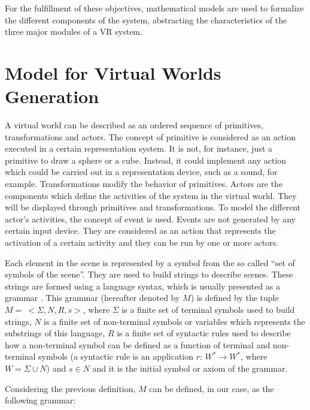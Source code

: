 \documentclass[10pt,journal,letterpaper,compsoc]{IEEEtran}
\begin{document}
For the fulfillment of these objectives, mathematical models are used to formalize the different
components of the system, abstracting the characteristics of the three major modules of a VR
system.





\section{Model for Virtual Worlds Generation
\label{sec:model}}

A virtual world can be described as an ordered sequence of primitives, transformations and actors.
The concept of primitive is considered as an action executed in a certain
representation system. It is not, for instance, just a primitive to draw a sphere or a cube.
Instead, it could implement any action which could be carried out in a representation device, such
as a sound, for example. Transformations modify the behavior of primitives. Actors are the components which define the activities of the system in the virtual world. They will be displayed through primitives and transformations. To model the different actor's activities, the concept of event is used. Events
are not generated by any certain input device. They are considered as an action that represents the
activation of a certain activity and they can be run by one or more actors.

Each element in the scene is represented by a symbol from the so called ``set of symbols of the
scene''. They are used to build strings to describe scenes. These strings are formed using
a language syntax, which is usually presented as a grammar \cite{Davis1994}. This grammar
(hereafter denoted by $M$) is defined by the tuple $M= \ <\Sigma, N, R, s>$, where $\Sigma$ is a
finite set of terminal symbols used to build strings, $N$ is a finite set of non-terminal symbols
or variables which represents the substrings of this language, $R$ is a finite set of syntactic
rules used to describe how a non-terminal symbol can be defined as a function of terminal and
non-terminal symbols (a syntactic rule is an application $r$: $W^* \rightarrow W^*$, where $W =
\Sigma \cup N$) and $s \in N$ and it is the initial symbol or axiom of the grammar.

Considering the previous definition, $M$ can be defined, in our case, as the following grammar:
\end{document}
